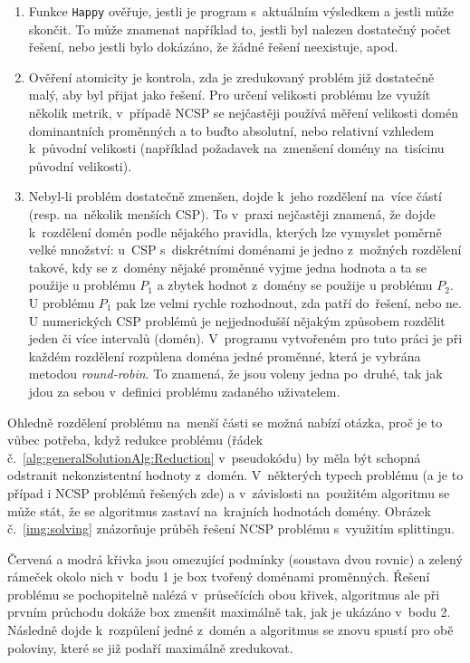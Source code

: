 \begin{enumerate}
    \item Funkce \verb|Happy| ověřuje, jestli je program  s~aktuálním výsledkem a jestli může skončit. To může znamenat například to, jestli byl nalezen dostatečný počet řešení, nebo jestli bylo dokázáno, že žádné řešení neexistuje, apod.
    \item Ověření atomicity je kontrola, zda je zredukovaný problém již dostatečně malý, aby byl přijat jako řešení. Pro určení velikosti problému lze využít několik metrik, v~případě NCSP se nejčastěji používá měření velikosti domén dominantních proměnných a to buďto absolutní, nebo relativní vzhledem k~původní velikosti (například požadavek na~zmenšení domény na~tisícinu původní velikosti).
    \item Nebyl-li problém dostatečně zmenšen, dojde k~jeho rozdělení na~více částí (resp. na~několik menších CSP). To v~praxi nejčastěji znamená, že dojde k~rozdělení domén podle nějakého pravidla, kterých lze vymyslet poměrně velké množství: u~CSP s~diskrétními doménami je jedno z~možných rozdělení takové, kdy se z~domény nějaké proměnné vyjme jedna hodnota a ta se použije u problému $P_1$ a zbytek hodnot z~domény se použije u problému $P_2$. U problému $P_1$ pak lze velmi rychle rozhodnout, zda patří do~řešení, nebo ne. U numerických CSP problémů je nejjednodušší nějakým způsobem rozdělit jeden či více intervalů (domén). V~programu vytvořeném pro tuto práci je při každém rozdělení rozpůlena doména jedné proměnné, která je vybrána metodou \emph{round-robin}. To znamená, že jsou voleny jedna po~druhé, tak jak jdou za sebou v~definici problému zadaného uživatelem.
\end{enumerate}

Ohledně rozdělení problému na~menší části se možná nabízí otázka, proč je to vůbec potřeba, když redukce problému (řádek č.~\ref{alg:generalSolutionAlg:Reduction} v~pseudokódu) by měla být schopná odstranit nekonzistentní hodnoty z~domén. V~některých typech problému (a je to případ i NCSP problémů řešených zde) a v~závislosti na~použitém algoritmu se může stát, že se algoritmus zastaví na~krajních hodnotách domény. Obrázek č.~\ref{img:solving} znázorňuje průběh řešení NCSP problému s~využitím splittingu.

Červená a modrá křivka jsou omezující podmínky (soustava dvou rovnic) a zelený rámeček okolo nich v~bodu 1 je box tvořený doménami proměnných. Řešení problému se pochopitelně nalézá v~průsečících obou křivek, algoritmus ale při prvním průchodu dokáže box zmenšit maximálně tak, jak je ukázáno v~bodu 2. Následně dojde k~rozpůlení jedné z~domén a algoritmus se znovu spustí pro obě poloviny, které se již podaří maximálně zredukovat.

